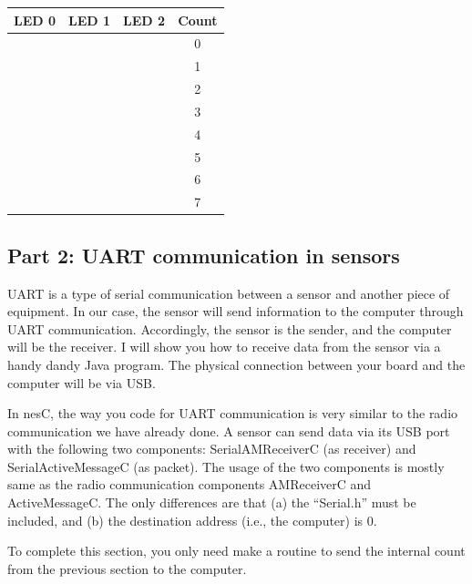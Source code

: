 \documentclass[letterpaper,12pt]{article}
\begin{document}
\begin{table}[H]
\begin{center}
    \begin{tabular}{|c|c|c|c|}
        \hline
        \textbf{LED 0} & \textbf{LED 1} & \textbf{LED 2} & \textbf{Count} \\ \hline
         & & & 0 \\ \hline
         & & & 1 \\ \hline
         & & & 2 \\ \hline
         & & & 3 \\ \hline
         & & & 4 \\ \hline
         & & & 5 \\ \hline
         & & & 6 \\ \hline
         & & & 7 \\ \hline
    \end{tabular}
\end{center}
\end{table}

\subsection*{Part 2: UART communication in sensors}
UART is a type of serial communication between a sensor and another piece of equipment.
In our case, the sensor will send information to the computer through UART communication.
Accordingly, the sensor is the sender, and the computer will be the receiver. I will show
you how to receive data from the sensor via a handy dandy Java program.
The physical connection between your board and the computer will be via USB.

In nesC, the way you code for UART communication is very similar to the radio communication
we have already done. A sensor can send data via its USB port with the following two components:
SerialAMReceiverC (as receiver) and SerialActiveMessageC (as packet). The usage of the two
components is mostly same as the radio communication components AMReceiverC and ActiveMessageC.
The only differences are that (a) the “Serial.h” must be included, and (b) the destination address
(i.e., the computer) is 0.

To complete this section, you only need make a routine to send the internal count from the previous
section to the computer.
\end{document}
